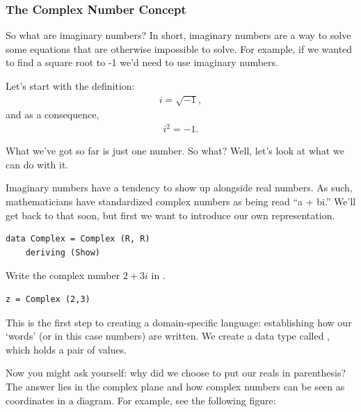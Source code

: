 \subsubsection{The Complex Number Concept}
So what are imaginary numbers? 
In short, imaginary numbers are a way to solve some equations that are otherwise impossible to solve. For example, if we wanted to find a square root to -1 we'd need to use imaginary numbers. 


Let's start with the definition:
\begin{align*}
    i = \sqrt{-1},
\end{align*}
and as a consequence, 
\begin{align*}
    i^2 = -1.
\end{align*}

What we've got so far is just one number. So what? Well, let's look at what we can do with it. 

Imaginary numbers have a tendency to show up alongside real numbers. As such, mathematicians have standardized complex numbers as being read ``a + bi.'' 
We'll get back to that soon, but first we want to introduce our own representation. 

\begin{verbatim}
data Complex = Complex (R, R)
    deriving (Show)
\end{verbatim}

\begin{example}
Write the complex number $2+3i$ in .
\end{example}
\begin{solution} %
\begin{verbatim}
z = Complex (2,3)
\end{verbatim}
\end{solution}

This is the first step to creating a domain-specific language: establishing how our `words' (or in this case numbers) are written. We create a data type called , which holds a pair of values. 

Now you might ask yourself: why did we choose to put our reals in parenthesis? The answer lies in the complex plane and how complex numbers can be seen as coordinates in a diagram. For example, see the following figure:

